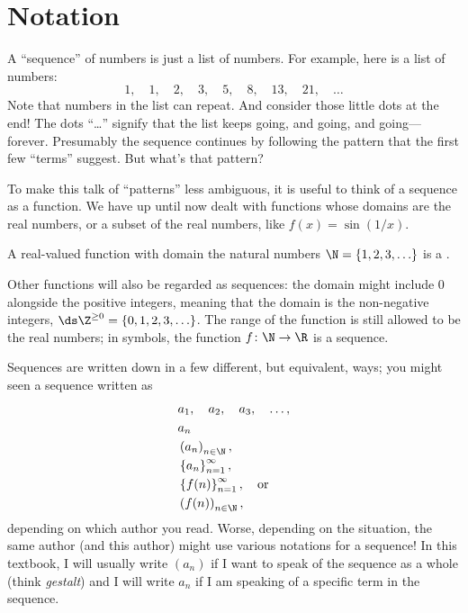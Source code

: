 
\section{Notation}
\label{section:notation}


\nobreak A ``sequence'' of numbers is just a list of numbers.  For
example, here is a list of numbers:
$$
1,\quad 1,\quad 2,\quad 3,\quad 5,\quad 8,\quad 13,\quad 21,\quad \ldots
$$
Note that numbers in the list can repeat.  And consider those little
dots at the end!  The dots ``\ldots'' signify that the list keeps
going, and going, and going---forever.  Presumably the sequence
continues by following the pattern that the first few ``terms''
suggest.  But what's that pattern?

To make this talk of ``patterns'' less ambiguous, it is useful to
think of a sequence as a function. We have up until now dealt with
functions whose domains are the real numbers, or a subset of the real
numbers, like $f(x)=\sin (1/x)$.

A real-valued function with domain the natural numbers
$\N=\{1,2,3,\ldots\}$ is a .

Other functions will also be regarded as sequences: the domain might
include $0$ alongside the positive integers, meaning that the
domain is the non-negative integers, $\ds
\Z^{\ge0}=\{0,1,2,3,\ldots\}$.  The range of the function is still
allowed to be the real numbers; in symbols, the function $f\colon
\N\to\R$ is a sequence.


Sequences are written down in a few different, but equivalent,
ways; you might seen a sequence written as
\begin{align*}
  & a_1,\quad a_2, \quad a_3, \quad\ldots, \\
  & a_n \\
  & \left(a_n\right)_{n \in \N}, \\
  & \left\{a_n\right\}_{n=1}^\infty, \\
  & \left\{f(n)\right\}_{n=1}^\infty, \quad \mbox{or} \\
  & \left(f(n)\right)_{n \in \N},
\end{align*}
depending on which author you read.  Worse, depending on the
situation, the same author (and this author) might use various
notations for a sequence!  In this textbook, I will usually write
$(a_n)$ if I want to speak of the sequence as a whole (think
\textit{gestalt}) and I will write $a_n$ if I am speaking of a
specific term in the sequence.

